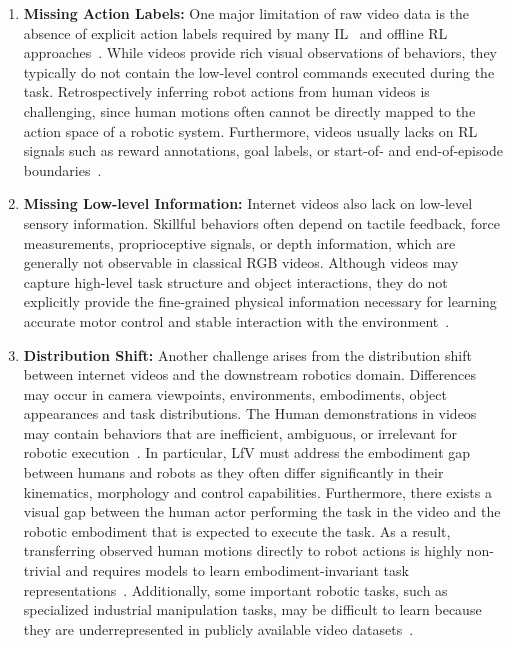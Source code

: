 \begin{enumerate}
	\item \textbf{Missing Action Labels:} One major limitation of raw video data is the absence of explicit action labels required by many \ac{IL}~\cite{Brohan2022RT1RT} and offline \ac{RL} approaches~\cite{Chebotar2023QTransformerSO}. While videos provide rich visual observations of behaviors, they typically do not contain the low-level control commands executed during the task. Retrospectively inferring robot actions from human videos is challenging, since human motions often cannot be directly mapped to the action space of a robotic system. Furthermore, videos usually lacks on \ac{RL} signals such as reward annotations, goal labels, or start-of- and end-of-episode boundaries~\cite{McCarthy_2025}.
	
	\item \textbf{Missing Low-level Information:} Internet videos also lack on low-level sensory information. Skillful behaviors often depend on tactile feedback, force measurements, proprioceptive signals, or depth information, which are generally not observable in classical RGB videos. Although videos may capture high-level task structure and object interactions, they do not explicitly provide the fine-grained physical information necessary for learning accurate motor control and stable interaction with the environment~\cite{McCarthy_2025}.
	
	\item \textbf{Distribution Shift:}
	Another challenge arises from the distribution shift between internet videos and the downstream robotics domain. Differences may occur in camera viewpoints, environments, embodiments, object appearances and task distributions. The Human demonstrations in videos may contain behaviors that are inefficient, ambiguous, or irrelevant for robotic execution~\cite{McCarthy_2025}.
	In particular, \ac{LfV} must address the embodiment gap between humans and robots as they often differ significantly in their kinematics, morphology and control capabilities. Furthermore, there exists a visual gap between the human actor performing the task in the video and the robotic embodiment that is expected to execute the task. As a result, transferring observed human motions directly to robot actions is highly non-trivial and requires models to learn embodiment-invariant task representations~\cite{McCarthy_2025}.
	Additionally, some important robotic tasks, such as specialized industrial manipulation tasks, may be difficult to learn because they are underrepresented in publicly available video datasets~\cite{McCarthy_2025}.
	

\end{enumerate}

